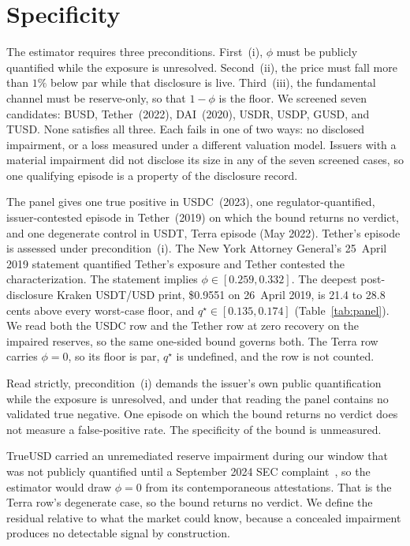 \section{Specificity}
\label{sec:spec}

The estimator requires three preconditions. First~(i), $\phi$ must be publicly
quantified while the exposure is unresolved. Second~(ii), the price must fall more
than $1\%$ below par while that disclosure is live. Third~(iii), the fundamental
channel must be reserve-only, so that $1-\phi$ is the floor. We screened seven
candidates: BUSD, Tether~(2022), DAI~(2020), USDR, USDP, GUSD, and TUSD. None
satisfies all three. Each fails in one of two ways: no disclosed impairment, or
a loss measured under a different valuation model. Issuers with a material impairment
did not disclose its size in any of the seven screened cases, so one qualifying
episode is a property of the disclosure record.

The panel gives one true
positive in USDC~(2023), one regulator-quantified, issuer-contested episode in
Tether~(2019) on which the bound returns no verdict, and one degenerate control in
USDT, Terra episode (May 2022). Tether's episode is assessed under
precondition~(i). The New York Attorney General's 25~April 2019 statement quantified
Tether's exposure and Tether contested the characterization. The statement implies
$\phi\in[0.259,0.332]$. The deepest post-disclosure Kraken USDT/USD print, \$0.9551
on 26~April 2019, is 21.4 to 28.8 cents above every worst-case floor, and
$q^{\star}\in[0.135,0.174]$ (Table~\ref{tab:panel}). We read both the USDC row and
the Tether row at zero recovery on the impaired reserves, so the same one-sided bound
governs both. The Terra row carries $\phi=0$, so its floor is par, $q^{\star}$ is
undefined, and the row is not counted.

Read strictly, precondition~(i) demands the issuer's own public quantification while
the exposure is unresolved, and under that reading the panel contains no validated
true negative. One episode on which the bound returns no verdict does not measure a
false-positive rate. The specificity of the bound is unmeasured.

TrueUSD carried an unremediated reserve impairment during our window that was not
publicly quantified until a September 2024 SEC complaint~\cite{sectruecoin2024}, so the
estimator would draw $\phi=0$ from its contemporaneous attestations. That is the Terra
row's degenerate case, so the bound returns no verdict. We
define the residual relative to what the market could know, because a concealed
impairment produces no detectable signal by construction.
